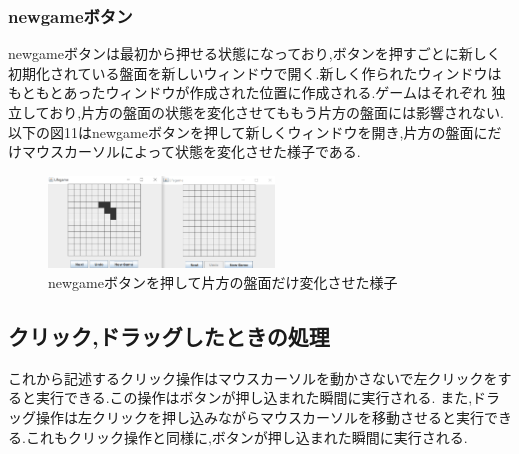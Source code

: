 \documentclass[dvipdfmx]{jarticle}
\begin{document}
\subsubsection{newgameボタン}
newgameボタンは最初から押せる状態になっており,ボタンを押すごとに新しく初期化されている盤面を新しいウィンドウで開く.新しく作られたウィンドウはもともとあったウィンドウが作成された位置に作成される.ゲームはそれぞれ
独立しており,片方の盤面の状態を変化させてももう片方の盤面には影響されない.
以下の図11はnewgameボタンを押して新しくウィンドウを開き,片方の盤面にだけマウスカーソルによって状態を変化させた様子である.
\begin{figure}[h]
  \centering
  \includegraphics[width=6cm]{newgame.png}
  \caption{newgameボタンを押して片方の盤面だけ変化させた様子}
\end{figure}
\subsection{クリック,ドラッグしたときの処理}
これから記述するクリック操作はマウスカーソルを動かさないで左クリックをすると実行できる.この操作はボタンが押し込まれた瞬間に実行される.
また,ドラッグ操作は左クリックを押し込みながらマウスカーソルを移動させると実行できる.これもクリック操作と同様に,ボタンが押し込まれた瞬間に実行される.
\end{document}
